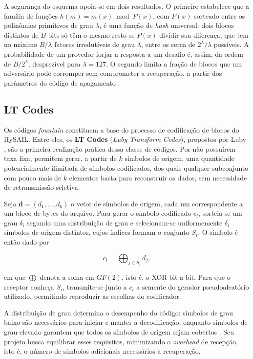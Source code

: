 A segurança do esquema apoia-se em dois resultados. O primeiro estabelece que a família de funções $h(m) = m(x) \bmod P(x)$, com $P(x)$ sorteado entre os polinômios primitivos de grau $\lambda$, é uma função de \emph{hash} universal: dois blocos distintos de $B$ bits só têm o mesmo resto se $P(x)$ dividir sua diferença, que tem no máximo $B/\lambda$ fatores irredutíveis de grau $\lambda$, entre os cerca de $2^\lambda/\lambda$ possíveis. A probabilidade de um provedor forjar a resposta a um desafio é, assim, da ordem de $B/2^\lambda$, desprezível para $\lambda = 127$. O segundo limita a fração de blocos que um adversário pode corromper sem comprometer a recuperação, a partir dos parâmetros do código de apagamento \cite{amaral2019hysail}.

\subsection{LT Codes}
Os códigos \emph{fountain} constituem a base do processo de codificação de blocos do HySAIL. Entre eles, os \textbf{LT Codes} (\emph{Luby Transform Codes}), propostos por Luby \cite{luby2002lt}, são a primeira realização prática dessa classe de códigos. Por não possuírem taxa fixa, permitem gerar, a partir de $k$ símbolos de origem, uma quantidade potencialmente ilimitada de símbolos codificados, dos quais qualquer subconjunto com pouco mais de $k$ elementos basta para reconstruir os dados, sem necessidade de retransmissão seletiva.

Seja $\mathbf{d} = (d_1, \ldots, d_k)$ o vetor de símbolos de origem, cada um correspondente a um bloco de bytes do arquivo. Para gerar o símbolo codificado $c_i$, sorteia-se um grau $\delta_i$ segundo uma distribuição de grau e selecionam-se uniformemente $\delta_i$ símbolos de origem distintos, cujos índices formam o conjunto $S_i$. O símbolo é então dado por

\begin{equation}
	c_i = \bigoplus_{j \in S_i} d_j,
	\label{eq:lt_codificacao}
\end{equation}

\noindent em que $\bigoplus$ denota a soma em $GF(2)$, isto é, o XOR bit a bit. Para que o receptor conheça $S_i$, transmite-se junto a $c_i$ a semente do gerador pseudoaleatório utilizado, permitindo reproduzir as escolhas do codificador.

A distribuição de grau determina o desempenho do código: símbolos de grau baixo são necessários para iniciar e manter a decodificação, enquanto símbolos de grau elevado garantem que todos os símbolos de origem sejam cobertos \cite{luby2002lt}. Seu projeto busca equilibrar esses requisitos, minimizando o \emph{overhead} de recepção, isto é, o número de símbolos adicionais necessários à recuperação.

